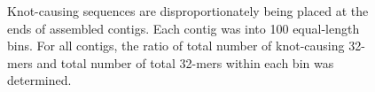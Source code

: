 \documentclass[11pt]{article} %
\begin{document}
\begin{figure}
\caption{Knot-causing sequences are disproportionately being placed at the ends of assembled contigs.  Each contig was into 100 equal-length bins.  For all contigs, the ratio of total number of knot-causing 32-mers and total number of total 32-mers within each bin was determined.}
\end{figure}
\end{document}
